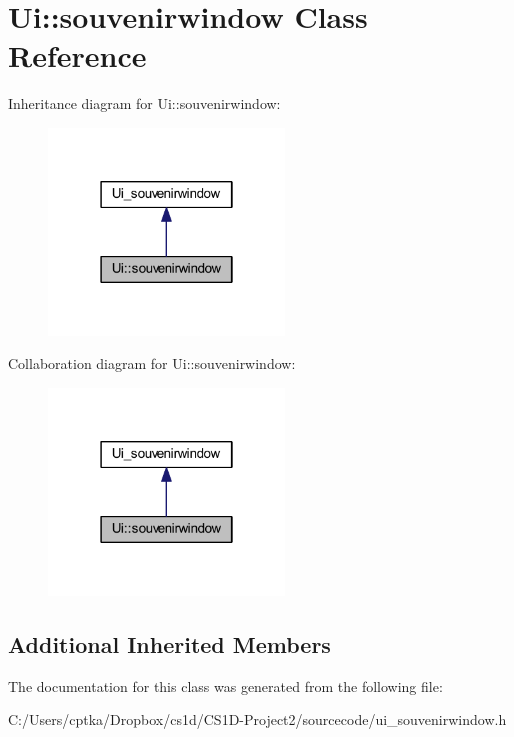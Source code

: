 \hypertarget{class_ui_1_1souvenirwindow}{}\section{Ui\+:\+:souvenirwindow Class Reference}
\label{class_ui_1_1souvenirwindow}


Inheritance diagram for Ui\+:\+:souvenirwindow\+:
\nopagebreak
\begin{figure}[H]
\begin{center}
\leavevmode
\includegraphics[width=178pt]{class_ui_1_1souvenirwindow__inherit__graph}
\end{center}
\end{figure}


Collaboration diagram for Ui\+:\+:souvenirwindow\+:
\nopagebreak
\begin{figure}[H]
\begin{center}
\leavevmode
\includegraphics[width=178pt]{class_ui_1_1souvenirwindow__coll__graph}
\end{center}
\end{figure}
\subsection*{Additional Inherited Members}


The documentation for this class was generated from the following file\+:\begin{DoxyCompactItemize}
\item 
C\+:/\+Users/cptka/\+Dropbox/cs1d/\+C\+S1\+D-\/\+Project2/sourcecode/ui\+\_\+souvenirwindow.\+h\end{DoxyCompactItemize}
